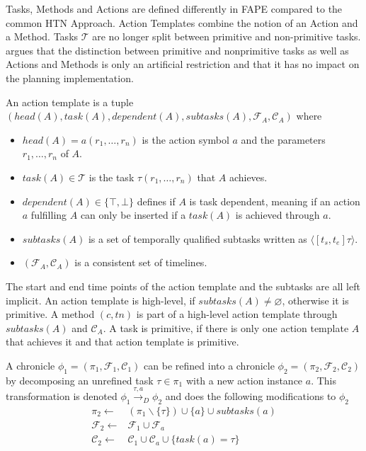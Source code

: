 Tasks, Methods and Actions are defined differently in FAPE compared to the common HTN Approach.
Action Templates combine the notion of an Action and a Method.
Tasks $\mathcal{T}$ are no longer split between primitive and non-primitive tasks.
\cite{bit-monnotTemporalHierarchicalModels2016a} argues that the distinction between primitive and nonprimitive tasks as well as Actions and Methods is only an artificial restriction and that it has no impact on the planning implementation.

\begin{definition}
  An action template is a tuple \\ $(head(A), task(A), dependent(A), subtasks(A), \mathcal{F}_A, \mathcal{C}_A)$ where
  \begin{itemize}
    \item $head(A) = a(r_1,\dots,r_n)$ is the action symbol $a$ and the parameters $r_1,\dots,r_n$ of $A$.
    \item $task(A) \in \mathcal{T}$ is the task $\tau(r_1,\dots,r_n)$ that $A$ achieves.
    \item $dependent(A) \in \{\top,\bot\}$ defines if $A$ is task dependent, meaning if an action $a$ fulfilling $A$ can only be inserted if a $task(A)$ is achieved through $a$.
    \item $subtasks(A)$ is a set of temporally qualified subtasks written as $\langle[t_s,t_e] \tau\rangle$.
    \item $(\mathcal{F}_A, \mathcal{C}_A)$ is a consistent set of timelines.
  \end{itemize}
\end{definition}

The start and end time points of the action template and the subtasks are all left implicit.
An action template is high-level, if $subtasks(A) \neq \varnothing$, otherwise it is primitive.
A method $(c,tn)$ is part of a high-level action template through $subtasks(A)$ and $\mathcal{C}_A$.
A task is primitive, if there is only one action template $A$ that achieves it and that action template is primitive.

\begin{definition}
  A chronicle $\phi_1 = (\pi_1,\mathcal{F}_1,\mathcal{C}_1)$ can be refined into a chronicle $\phi_2 = (\pi_2,\mathcal{F}_2,\mathcal{C}_2)$ by decomposing an unrefined task $\tau \in \pi_1$ with a new action instance $a$. This transformation is denoted $\phi_1 \xrightarrow{\tau,a}_D \phi_2$ and does the following modifications to $\phi_2$
  \begin{align*}
    \pi_2 \leftarrow & (\pi_1  \backslash \{\tau\}) \cup \{a\} \cup subtasks(a) \\
    \mathcal{F}_2 \leftarrow & \mathcal{F}_1 \cup \mathcal{F}_a \\
    \mathcal{C}_2 \leftarrow & \mathcal{C}_1 \cup \mathcal{C}_a \cup \{task(a) = \tau\} \\
  \end{align*}
  \label{def:htn-task-dec-fape}
\end{definition}

